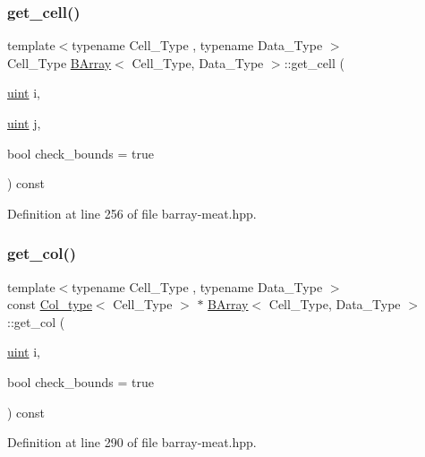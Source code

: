 \subsubsection{\texorpdfstring{get\+\_\+cell()}{get\_cell()}}
{\footnotesize\ttfamily template$<$typename Cell\+\_\+\+Type , typename Data\+\_\+\+Type $>$ \\
Cell\+\_\+\+Type \hyperlink{class_b_array}{B\+Array}$<$ Cell\+\_\+\+Type, Data\+\_\+\+Type $>$\+::get\+\_\+cell (\begin{DoxyParamCaption}\item[{\hyperlink{typedefs_8hpp_a91ad9478d81a7aaf2593e8d9c3d06a14}{uint}}]{i,  }\item[{\hyperlink{typedefs_8hpp_a91ad9478d81a7aaf2593e8d9c3d06a14}{uint}}]{j,  }\item[{bool}]{check\+\_\+bounds = {\ttfamily true} }\end{DoxyParamCaption}) const\hspace{0.3cm}{\ttfamily [inline]}}



Definition at line 256 of file barray-\/meat.\+hpp.

\mbox{\label{class_b_array_a90bd31bc0b3fa59d11150cd4ea39b3b6}} 
\subsubsection{\texorpdfstring{get\+\_\+col()}{get\_col()}}
{\footnotesize\ttfamily template$<$typename Cell\+\_\+\+Type , typename Data\+\_\+\+Type $>$ \\
const \hyperlink{typedefs_8hpp_a3bb95a7612ee928fba42f33a96adb3eb}{Col\+\_\+type}$<$ Cell\+\_\+\+Type $>$ $\ast$ \hyperlink{class_b_array}{B\+Array}$<$ Cell\+\_\+\+Type, Data\+\_\+\+Type $>$\+::get\+\_\+col (\begin{DoxyParamCaption}\item[{\hyperlink{typedefs_8hpp_a91ad9478d81a7aaf2593e8d9c3d06a14}{uint}}]{i,  }\item[{bool}]{check\+\_\+bounds = {\ttfamily true} }\end{DoxyParamCaption}) const\hspace{0.3cm}{\ttfamily [inline]}}



Definition at line 290 of file barray-\/meat.\+hpp.

\mbox{\label{class_b_array_aa2d5a133fc4adf3417f1fdc2ef5aae26}} 
